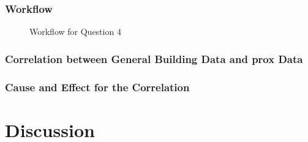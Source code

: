 \documentclass[aps, 10pt, a4paper]{article}
\begin{document}
            \subsubsection{Workflow}
                \begin{figure}[htbp]
                    \centering
                    \begin{tikzpicture}[node distance = 2cm, auto]
                    \end{tikzpicture}
                    \caption{Workflow for Question 4}
                    \label{fig:workflow4}
                \end{figure}
            
            \subsubsection{Correlation between General Building Data and prox Data}
            
            \subsubsection{Cause and Effect for the Correlation}
    
    \section{Discussion}
    
    
    
\end{document}
